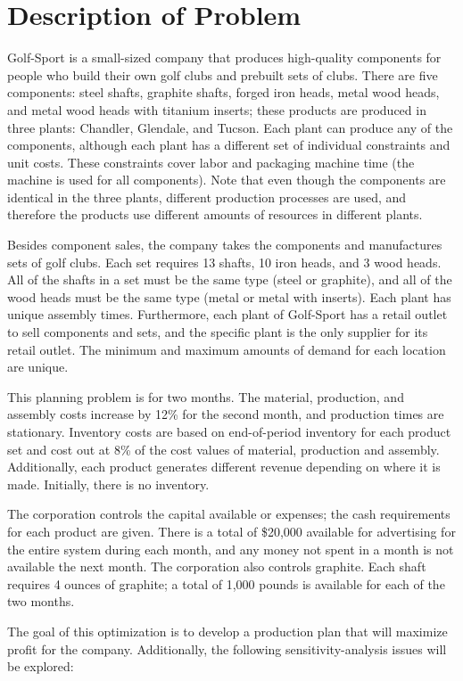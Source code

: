 \documentclass{article}
\begin{document}
\section{Description of Problem}
Golf-Sport is a small-sized company that produces high-quality components for people who build their own golf clubs and prebuilt sets of clubs. There are five components:  steel shafts, graphite shafts, forged iron heads, metal wood heads, and metal wood heads with titanium inserts; these products are produced in three plants:  Chandler, Glendale, and Tucson. Each plant can produce any of the components, although each plant has a different set of individual constraints and unit costs. These constraints cover labor and packaging machine time (the machine is used for all components). Note that even though the components are identical in the three plants, different production processes are used, and therefore the products use different amounts of resources in different plants.
\par
Besides component sales, the company takes the components and manufactures sets of golf clubs. Each set requires 13 shafts, 10 iron heads, and 3 wood heads. All of the shafts in a set must be the same type (steel or graphite), and all of the wood heads must be the same type (metal or metal with inserts). Each plant has unique assembly times.  Furthermore, each plant of Golf-Sport has a retail outlet to sell components and sets, and the specific plant is the only supplier for its retail outlet. The minimum and maximum amounts of demand for each location are unique.
\par
This planning problem is for two months. The material, production, and assembly costs increase by 12\% for the second month, and production times are stationary. Inventory costs are based on end-of-period inventory for each product set and cost out at 8\% of the cost values of material, production and assembly. Additionally, each product generates different revenue depending on where it is made. Initially, there is no inventory.
\par
The corporation controls the capital available or expenses; the cash requirements for each product are given. There is a total of \$20,000 available for advertising for the entire system during each month, and any money not spent in a month is not available the next month. The corporation also controls graphite. Each shaft requires 4 ounces of graphite; a total of 1,000 pounds is available for each of the two months. 
\par
The goal of this optimization is to develop a production plan that will maximize profit for the company. Additionally, the following sensitivity-analysis issues will be explored:
\end{document}
